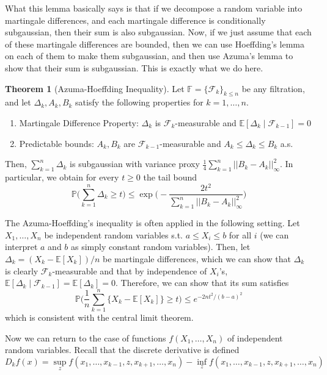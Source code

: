 \documentclass{article}
\theoremstyle{definition}
\newtheorem{theorem}{Theorem}[section]
\theoremstyle{remark}
\theoremstyle{definition}
\begin{document}
  What this lemma basically says is that if we decompose a random variable into martingale differences, and each martingale difference is conditionally subgaussian, then their sum is also subgaussian. Now, if we just assume that each of these martingale differences are bounded, then we can use Hoeffding's lemma on each of them to make them subgaussian, and then use Azuma's lemma to show that their sum is subgaussian. This is exactly what we do here. 

  \begin{theorem}[Azuma-Hoeffding Inequality]
  Let $\mathbb{F} = \{ \mathcal{F}_k \}_{k \leq n}$ be any filtration, and let $\Delta_k, A_k, B_k$ satisfy the following properties for $k = 1, \ldots, n$. 
  \begin{enumerate}
      \item Martingale Difference Property: $\Delta_k$ is $\mathcal{F}_k$-measurable and $\mathbb{E}[\Delta_k \mid \mathcal{F}_{k-1}] = 0$ 
      \item Predictable bounds: $A_k, B_k$ are $\mathcal{F}_{k-1}$-measurable and $A_k \leq \Delta_k \leq B_k$ a.s. 
  \end{enumerate}
  Then, $\sum_{k=1}^n \Delta_k$ is subgaussian with variance proxy $\frac{1}{4} \sum_{k=1}^n ||B_k - A_k||^2_\infty$. In particular, we obtain for every $t \geq 0$ the tail bound 
  \[\mathbb{P} \bigg( \sum_{k=1}^n \Delta_k \geq t \bigg) \leq \exp \bigg( - \frac{2t^2}{\sum_{k=1}^n ||B_k - A_k||_\infty^2} \bigg)\]
  \end{theorem}

  The Azuma-Hoeffding's inequality is often applied in the following setting. Let $X_1, \ldots, X_n$ be independent random variables s.t. $a \leq X_i \leq b$ for all $i$ (we can interpret $a$ and $b$ as simply constant random variables). Then, let $\Delta_k = (X_k - \mathbb{E}[X_k])/n$ be martingale differences, which we can show that $\Delta_k$ is clearly $\mathcal{F}_k$-measurable and that by independence of $X_i$'s,  $\mathbb{E}[\Delta_k \mid \mathcal{F}_{k-1}] = \mathbb{E}[\Delta_k] = 0$. Therefore, we can show that its sum satisfies
  \[\mathbb{P} \bigg( \frac{1}{n} \sum_{k=1}^n \{X_k - \mathbb{E}[X_k]\} \geq t \bigg) \leq e^{-2n t^2 / (b - a)^2}\]
  which is consistent with the central limit theorem. 

  Now we can return to the case of functions $f(X_1, \ldots, X_n)$ of independent random variables. Recall that the discrete derivative is defined 
  \[D_k f(x) = \sup_z f(x_1, \ldots, x_{k-1}, z, x_{k+1}, \ldots, x_n) - \inf_z f(x_1, \ldots, x_{k-1}, z, x_{k+1}, \ldots, x_n)\]
\end{document}
